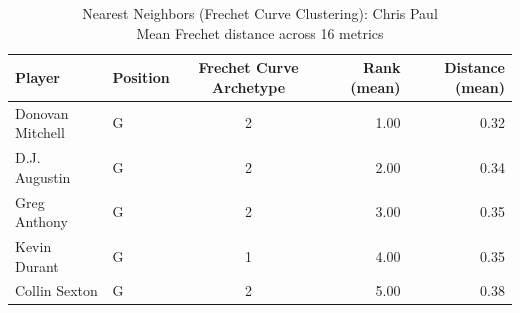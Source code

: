 \begin{table}[t]
\caption*{
{\fontsize{20}{25} Nearest Neighbors (Frechet Curve Clustering): Chris Paul\fontsize{12}{15}\selectfont } \\ 
{\fontsize{14}{17}\selectfont  Mean Frechet distance across 16 metrics\fontsize{12}{15}\selectfont }
} 
\fontsize{12.0pt}{14.0pt}\selectfont
\begin{tabular*}{\linewidth}{@{\extracolsep{\fill}}llcrr}
\toprule
Player & Position & Frechet Curve Archetype & Rank (mean) & Distance (mean) \\ 
\midrule\addlinespace[2.5pt]
Donovan Mitchell & G & 2 & 1.00 & 0.32 \\ 
D.J. Augustin & G & 2 & 2.00 & 0.34 \\ 
Greg Anthony & G & 2 & 3.00 & 0.35 \\ 
Kevin Durant & G & 1 & 4.00 & 0.35 \\ 
Collin Sexton & G & 2 & 5.00 & 0.38 \\ 
\bottomrule
\end{tabular*}
\end{table}

